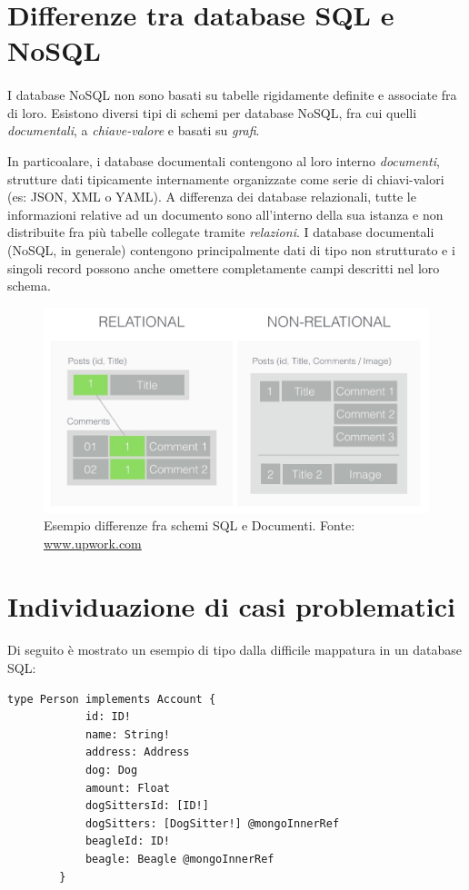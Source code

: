 \documentclass[a4paper, 12pt]{report}
\begin{document}
    \section{Differenze tra database SQL e NoSQL}
    \paragraph*{}
      I database NoSQL non sono basati su tabelle rigidamente definite e associate fra di loro.
      Esistono diversi tipi di schemi per database NoSQL, fra cui quelli \emph{documentali}, a \emph{chiave-valore} e basati su \emph{grafi}.
      
      In particoalare, i database documentali contengono al loro interno \emph{documenti}, strutture dati tipicamente internamente organizzate come serie di chiavi-valori (es: JSON, XML o YAML).
      A differenza dei database relazionali, tutte le informazioni relative ad un documento sono all'interno della sua istanza e non distribuite fra più tabelle collegate tramite \emph{relazioni}.
      I database documentali (NoSQL, in generale) contengono principalmente dati di tipo non strutturato e i singoli record possono anche omettere completamente campi descritti nel loro schema.
      \begin{figure}[H]
        \includegraphics[width=\textwidth]{relational-documental.jpg}
        \caption{Esempio differenze fra schemi SQL e Documenti. Fonte: \href{https://www.upwork.com/resources/sql-vs-nosql-databases-whats-the-difference/}{www.upwork.com}}
      \end{figure}

    \section{Individuazione di casi problematici}
    \paragraph*{}
    Di seguito è mostrato un esempio di tipo dalla difficile mappatura in un database SQL:
      \begin{Verbatim}[samepage=true]
        type Person implements Account {
            id: ID!
            name: String!
            address: Address
            dog: Dog
            amount: Float
            dogSittersId: [ID!]
            dogSitters: [DogSitter!] @mongoInnerRef
            beagleId: ID!
            beagle: Beagle @mongoInnerRef
        }
      \end{Verbatim}
\end{document}
